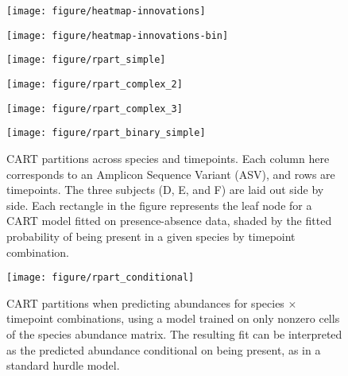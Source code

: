 \documentclass[14pt]{extreport}
\begin{document}
\begin{figure}
  \centering
  \texttt{[image: figure/heatmap-innovations]}
  \caption{\label{fig:heatmap-innovations} }
\end{figure}

\begin{figure}
  \centering
  \texttt{[image: figure/heatmap-innovations-bin]}
  \caption{\label{fig:heatmap-innovations-bin} }
\end{figure}


\begin{figure}
  \centering
  \texttt{[image: figure/rpart\_simple]}
  \caption{\label{fig:rpart_simple} }
\end{figure}

\begin{figure}
  \centering
  \texttt{[image: figure/rpart\_complex\_2]}
  \caption{\label{fig:label} }
\end{figure}

\begin{figure}
  \centering
  \texttt{[image: figure/rpart\_complex\_3]}
  \caption{\label{fig:rpart_complex_3} }
\end{figure}

\begin{figure}
  \centering
  \texttt{[image: figure/rpart\_binary\_simple]}
  \caption{CART partitions across species and timepoints. Each column here
    corresponds to an Amplicon Sequence Variant (ASV), and rows are timepoints.
    The three subjects (D, E, and F) are laid out side by side. Each rectangle
    in the figure represents the leaf node for a CART model fitted on
    presence-absence data, shaded by the fitted probability of being present in
    a given species by timepoint combination.
    \label{fig:rpart_binary_simple}}
\end{figure}

\begin{figure}
  \centering
  \texttt{[image: figure/rpart\_conditional]}
  \caption{CART partitions when predicting abundances for species $\times$
    timepoint combinations, using a model trained on only nonzero cells of the
    species abundance matrix. The resulting fit can be interpreted as the
    predicted abundance conditional on being present, as in a standard hurdle
    model. \label{fig:rpart_conditional} }
\end{figure}
\end{document}
